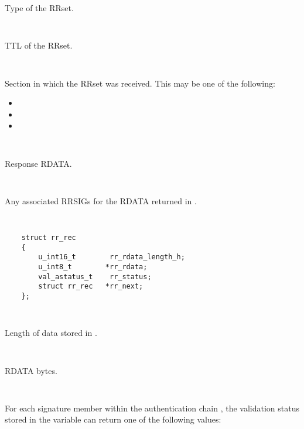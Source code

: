 \begin{description}
\begin{description}
Type of the RRset.

\item {}\verb" "

TTL of the RRset.

\item {}\verb" "

Section in which the RRset was received.  This may be one of the following:
\begin{itemize}
\item {}
\item {}
\item {}
\end{itemize}

\item {}\verb" "

Response RDATA.

\item {}\verb" "

Any associated RRSIGs for the RDATA returned in .

\end{description}

\item {}\verb" "

\begin{verbatim}
    struct rr_rec
    {
        u_int16_t        rr_rdata_length_h;  
        u_int8_t        *rr_rdata;      
        val_astatus_t    rr_status;
        struct rr_rec   *rr_next;
    };
\end{verbatim}

\begin{description}

\item {}\verb" "

Length of data stored in .

\item {}\verb" "

RDATA bytes.

\item {}\verb" "

For each signature  member within the authentication chain
, the validation status stored in the variable
 can return one of the following values:

\begin{itemize}


\end{itemize}
\end{description}
\end{description}

